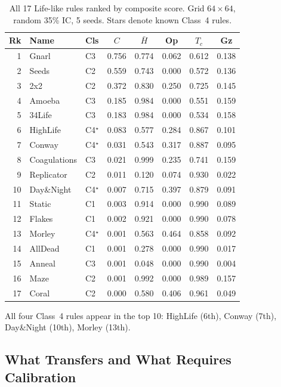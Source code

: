 \documentclass[12pt,a4paper]{article}
\begin{document}
\begin{table}[h]
\centering
\caption{All 17 Life-like rules ranked by composite score.
Grid $64{\times}64$, random 35\% IC, 5 seeds.
Stars denote known Class~4 rules.}
\begin{tabular}{rllccccc}
\toprule
Rk & Name & Cls & $C$ & $\bar{H}$ & Op & $T_c$ & Gz \\
\midrule
 1 & Gnarl        & C3   & 0.756 & 0.774 & 0.062 & 0.612 & 0.138 \\
 2 & Seeds        & C2   & 0.559 & 0.743 & 0.000 & 0.572 & 0.136 \\
 3 & 2x2          & C2   & 0.372 & 0.830 & 0.250 & 0.725 & 0.145 \\
 4 & Amoeba       & C3   & 0.185 & 0.984 & 0.000 & 0.551 & 0.159 \\
 5 & 34Life       & C3   & 0.183 & 0.984 & 0.000 & 0.534 & 0.158 \\
 6 & HighLife     & C4$^\star$ & 0.083 & 0.577 & 0.284 & 0.867 & 0.101 \\
 7 & Conway       & C4$^\star$ & 0.031 & 0.543 & 0.317 & 0.887 & 0.095 \\
 8 & Coagulations & C3   & 0.021 & 0.999 & 0.235 & 0.741 & 0.159 \\
 9 & Replicator   & C2   & 0.011 & 0.120 & 0.074 & 0.930 & 0.022 \\
10 & Day\&Night   & C4$^\star$ & 0.007 & 0.715 & 0.397 & 0.879 & 0.091 \\
11 & Static       & C1   & 0.003 & 0.914 & 0.000 & 0.990 & 0.089 \\
12 & Flakes       & C1   & 0.002 & 0.921 & 0.000 & 0.990 & 0.078 \\
13 & Morley       & C4$^\star$ & 0.001 & 0.563 & 0.464 & 0.858 & 0.092 \\
14 & AllDead      & C1   & 0.001 & 0.278 & 0.000 & 0.990 & 0.017 \\
15 & Anneal       & C3   & 0.001 & 0.048 & 0.000 & 0.990 & 0.004 \\
16 & Maze         & C2   & 0.001 & 0.992 & 0.000 & 0.989 & 0.157 \\
17 & Coral        & C2   & 0.000 & 0.580 & 0.406 & 0.961 & 0.049 \\
\bottomrule
\end{tabular}
\end{table}

All four Class~4 rules appear in the top 10: HighLife (6th), Conway (7th),
Day\&Night (10th), Morley (13th).

\subsection{What Transfers and What Requires Calibration}
\end{document}
